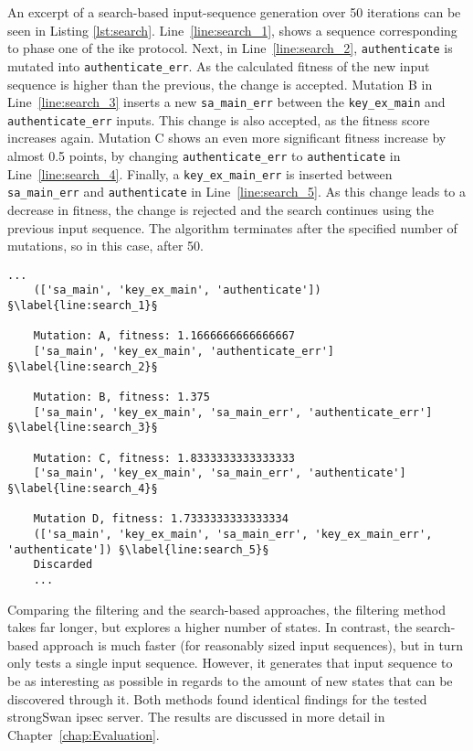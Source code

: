 An excerpt of a search-based input-sequence generation over 50 iterations can be seen in Listing \ref{lst:search}. 
Line~\ref{line:search_1}, shows a sequence corresponding to phase one of the \ac{ike} protocol. Next, in Line~\ref{line:search_2}, \texttt{authenticate} is mutated into \texttt{authenticate\_err}. As the calculated fitness of the new input sequence is higher than the previous, the change is accepted. Mutation B in Line~\ref{line:search_3} inserts a new \texttt{sa\_main\_err} between the \texttt{key\_ex\_main} and \texttt{authenticate\_err} inputs. This change is also accepted, as the fitness score increases again. Mutation C shows an even more significant fitness increase by almost 0.5 points, by changing \texttt{authenticate\_err} to \texttt{authenticate} in Line~\ref{line:search_4}. Finally, a \texttt{key\_ex\_main\_err} is inserted between \texttt{sa\_main\_err} and \texttt{authenticate} in Line~\ref{line:search_5}. As this change leads to a decrease in fitness, the change is rejected and the search continues using the previous input sequence. The algorithm terminates after the specified number of mutations, so in this case, after 50.

\begin{lstlisting}[float=h, caption=Search-based input-sequence generation example mutations., label=lst:search, escapechar=§]
	... 	
	(['sa_main', 'key_ex_main', 'authenticate']) §\label{line:search_1}§
	
	Mutation: A, fitness: 1.1666666666666667
	['sa_main', 'key_ex_main', 'authenticate_err'] §\label{line:search_2}§
	
	Mutation: B, fitness: 1.375
	['sa_main', 'key_ex_main', 'sa_main_err', 'authenticate_err'] §\label{line:search_3}§
	
	Mutation: C, fitness: 1.8333333333333333
	['sa_main', 'key_ex_main', 'sa_main_err', 'authenticate'] §\label{line:search_4}§
	
	Mutation D, fitness: 1.7333333333333334 
	(['sa_main', 'key_ex_main', 'sa_main_err', 'key_ex_main_err', 'authenticate']) §\label{line:search_5}§
	Discarded
	...
\end{lstlisting}

Comparing the filtering and the search-based approaches, the filtering method takes far longer, but explores a higher number of states. In contrast, the search-based approach is much faster (for reasonably sized input sequences), but in turn only tests a single input sequence. However, it generates that input sequence to be as interesting as possible in regards to the amount of new states that can be discovered through it. Both methods found identical findings for the tested strongSwan \ac{ipsec} server. The results are discussed in more detail in Chapter~\ref{chap:Evaluation}.\\

